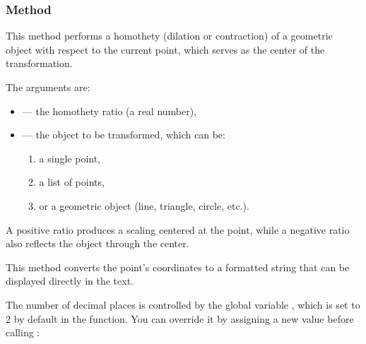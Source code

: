 \subsubsection{Method }
\label{ssub:method_point_homothety_k_obj}

This method performs a homothety (dilation or contraction) of a geometric object with respect to the current point, which serves as the center of the transformation.

\medskip
\noindent
The arguments are:
\begin{itemize}
  \item {} — the homothety ratio (a real number),
  \item {} — the object to be transformed, which can be:
  \begin{enumerate}
    \item a single point,
    \item a list of points,
    \item or a geometric object (line, triangle, circle, etc.).
  \end{enumerate}
\end{itemize}

\noindent
A positive ratio  produces a scaling centered at the point, while a negative ratio also reflects the object through the center.

\vspace{1em}

\begin{tkzexample}[latex=7cm]
\begin{center}
\end{center}
\end{tkzexample}

 This method converts the point’s coordinates to a formatted string that can be displayed directly in the text.

\medskip
\noindent
The number of decimal places is controlled by the global variable , which is set to $2$ by default in the  function. You can override it by assigning a new value before calling :


